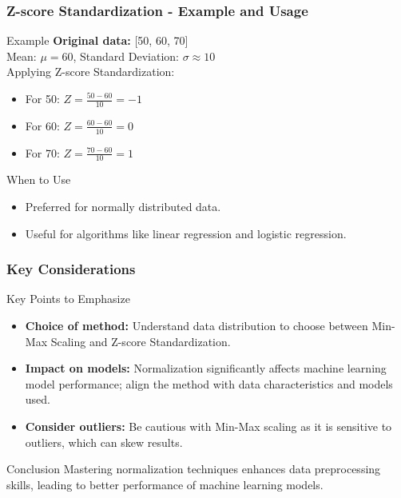 \documentclass[aspectratio=169]{beamer}
\begin{document}
\begin{frame}[fragile]
    \frametitle{Z-score Standardization - Example and Usage}
    \begin{block}{Example}
        \textbf{Original data:} [50, 60, 70] \\
        Mean: $\mu = 60$, Standard Deviation: $\sigma \approx 10$ \\
        Applying Z-score Standardization:
            \begin{itemize}
                \item For 50: $Z = \frac{50 - 60}{10} = -1$
                \item For 60: $Z = \frac{60 - 60}{10} = 0$
                \item For 70: $Z = \frac{70 - 60}{10} = 1$
            \end{itemize}
    \end{block}

    \begin{block}{When to Use}
        \begin{itemize}
            \item Preferred for normally distributed data.
            \item Useful for algorithms like linear regression and logistic regression.
        \end{itemize}
    \end{block}
\end{frame}

\begin{frame}[fragile]
    \frametitle{Key Considerations}
    \begin{block}{Key Points to Emphasize}
        \begin{itemize}
            \item \textbf{Choice of method:} Understand data distribution to choose between Min-Max Scaling and Z-score Standardization.
            \item \textbf{Impact on models:} Normalization significantly affects machine learning model performance; align the method with data characteristics and models used.
            \item \textbf{Consider outliers:} Be cautious with Min-Max scaling as it is sensitive to outliers, which can skew results.
        \end{itemize}
    \end{block}

    \begin{block}{Conclusion}
        Mastering normalization techniques enhances data preprocessing skills, leading to better performance of machine learning models.
    \end{block}
\end{frame}
\end{document}
